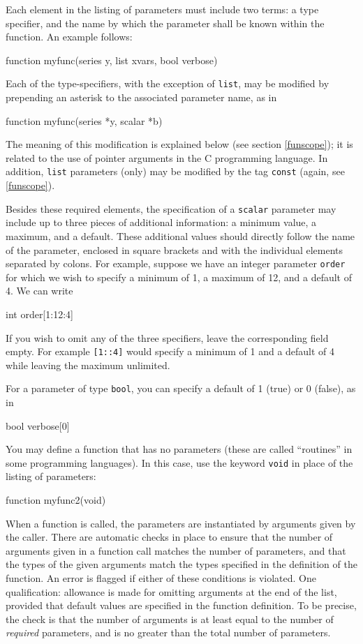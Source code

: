 Each element in the listing of parameters must include two terms: a
type specifier, and the name by which the parameter shall be known
within the function.  An example follows:
%    
\begin{code}
      function myfunc(series y, list xvars, bool verbose)
\end{code}

Each of the type-specifiers, with the exception of \texttt{list}, may
be modified by prepending an asterisk to the associated parameter
name, as in
%    
\begin{code}
      function myfunc(series *y, scalar *b)
\end{code}

The meaning of this modification is explained below (see section
\ref{funscope}); it is related to the use of pointer arguments in the
C programming language.  In addition, \texttt{list} parameters (only)
may be modified by the tag \texttt{const} (again, see \ref{funscope}).

Besides these required elements, the specification of a
\texttt{scalar} parameter may include up to three pieces of additional
information: a minimum value, a maximum, and a default.  These
additional values should directly follow the name of the parameter,
enclosed in square brackets and with the individual elements separated
by colons.  For example, suppose we have an integer parameter
\texttt{order} for which we wish to specify a minimum of 1, a maximum
of 12, and a default of 4.  We can write
%    
\begin{code}
      int order[1:12:4]
\end{code} 
%
If you wish to omit any of the three specifiers, leave the
corresponding field empty.  For example \texttt{[1::4]} would specify
a minimum of 1 and a default of 4 while leaving the maximum
unlimited.  

For a parameter of type \texttt{bool}, you can specify a default of
1 (true) or 0 (false), as in
%    
\begin{code}
      bool verbose[0]
\end{code} 
%

You may define a function that has no parameters (these are called
``routines'' in some programming languages).  In this case,  
use the keyword \texttt{void} in place of the listing of parameters:
%    
\begin{code}
      function myfunc2(void)
\end{code}

When a function is called, the parameters are instantiated by
arguments given by the caller.  There are automatic checks in place to
ensure that the number of arguments given in a function call matches
the number of parameters, and that the types of the given arguments
match the types specified in the definition of the function.  An error
is flagged if either of these conditions is violated.  One
qualification: allowance is made for omitting arguments at the end of
the list, provided that default values are specified in the function
definition.  To be precise, the check is that the number of arguments
is at least equal to the number of \textit{required} parameters, and
is no greater than the total number of parameters.

